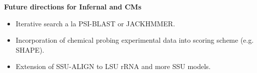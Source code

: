 \documentclass[landscape]{slides}
\begin{document}
\begin{slide}
\begin{center}

\textbf{Future directions for Infernal and CMs}
\end{center}
\medskip


\begin{itemize}
\item Iterative search a la PSI-BLAST or JACKHMMER.
\item Incorporation of chemical probing experimental data into scoring scheme
  (e.g. SHAPE).
\item Extension of SSU-ALIGN to LSU rRNA and more SSU models.
\end{itemize}

\vfill 
\end{slide}
\end{document}
